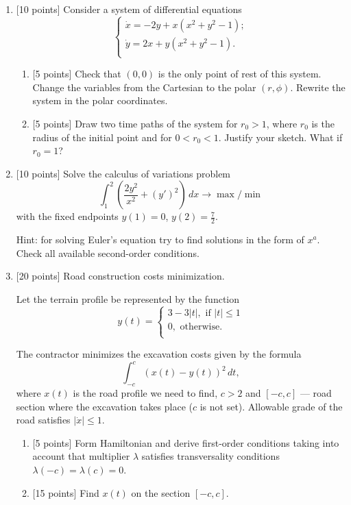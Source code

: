 \documentclass[12pt, a4paper]{article}
\begin{document}
\begin{enumerate}


\item {[10 points]} Consider a system of differential equations
\[
\begin{cases}
  \dot x = - 2y + x({x^2} + {y^2} - 1);\\
  \dot y =  2x + y({x^2} + {y^2} - 1).\\
\end{cases}
\]
\begin{enumerate}
  \item {[5 points]} Check that $(0,0)$ is the only point of rest of this system. Change the variables from the Cartesian to the polar $(r, \phi )$. Rewrite the system in the polar coordinates.
  \item {[5 points]} Draw two time paths of the system for $r_0 > 1$, where $r_0$ is the radius of the initial point and for $0 < r_0 < 1$. Justify your sketch. What if $r_0 = 1$?
\end{enumerate}

\item {[10 points]} Solve the calculus of variations problem \[
\int_1^2 \left( \frac{2y^2}{x^2} + (y')^2 \right) \, dx \to \max /\min
\]
with the fixed endpoints $y(1) = 0$, $y(2) = \frac{7}{2}$.

Hint: for solving Euler’s equation try to find solutions in the form of $x^a$. Check all available second-order conditions.

\item {[20 points]} Road construction costs minimization.

Let the terrain profile be represented by the function
\[
y(t) =
\begin{cases}
3 - 3|t|, \text{ if } |t|\leq 1 \\
0, \text{ otherwise.} \\
\end{cases}
\]

The contractor minimizes the excavation costs given by the formula
\[
\int_{-c}^c (x(t) - y(t))^2 \, dt,
\]
where $x(t)$ is the road profile we need to find, $c > 2$ and $[ - c,c]$ — road section where the excavation takes place ($c$ is not set). Allowable grade of the road satisfies  $| \dot x | \leq 1$.

\begin{enumerate}
\item {[5 points]} Form Hamiltonian and derive first-order conditions taking into account that multiplier $\lambda$ satisfies transversality conditions $\lambda(-c) = \lambda(c) = 0$.
\item {[15 points]} Find $x(t)$ on the section $[ - c,c]$.
\end{enumerate}

\end{enumerate}
\end{document}
